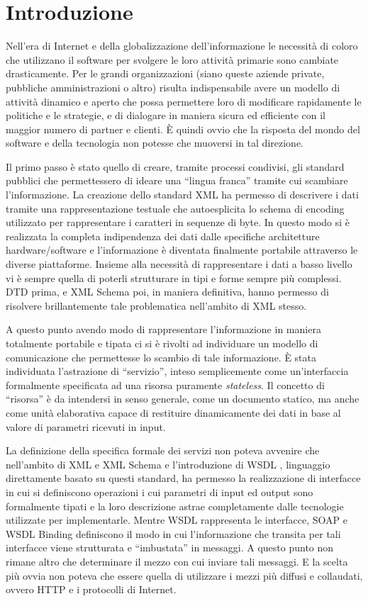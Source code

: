 \chapter{Introduzione}

Nell'era di Internet e della globalizzazione dell'informazione le necessità di
coloro che utilizzano il software per svolgere le loro attività primarie sono
cambiate drasticamente. Per le grandi organizzazioni (siano queste aziende
private, pubbliche amministrazioni o altro) risulta indispensabile avere un
modello di attività dinamico e aperto che possa permettere loro di modificare
rapidamente le politiche e le strategie, e di dialogare in maniera sicura ed
efficiente con il maggior numero di partner e clienti. \`E quindi ovvio che la
risposta del mondo del software e della tecnologia non potesse che muoversi in
tal direzione. 

Il primo passo è stato quello di creare, tramite processi condivisi, gli standard
pubblici che permettessero di ideare una ``lingua franca'' tramite cui scambiare
l'informazione. La creazione dello standard XML \cite{XML} ha permesso di
descrivere i dati tramite una rappresentazione testuale che autoesplicita lo
schema di encoding utilizzato per rappresentare i caratteri in sequenze di byte.
In questo modo si è realizzata la completa indipendenza dei dati dalle specifiche
architetture hardware/software e l'informazione è diventata finalmente portabile
attraverso le diverse piattaforme. Insieme alla necessità di rappresentare i dati
a basso livello vi è sempre quella di poterli strutturare in tipi e forme sempre
più complessi. DTD \cite{XML10} prima, e XML Schema \cite{XMLSchema} poi, in
maniera definitiva, hanno permesso di risolvere brillantemente tale problematica
nell'ambito di XML stesso.

A questo punto avendo modo di rappresentare l'informazione in maniera totalmente
portabile e tipata ci si è rivolti ad individuare un modello di comunicazione che
permettesse lo scambio di tale informazione. \`E stata individuata l'astrazione
di ``servizio'', inteso semplicemente come un'interfaccia formalmente specificata
ad una risorsa puramente \emph{stateless}. Il concetto di ``risorsa'' è da
intendersi in senso generale, come un documento statico, ma anche come unità
elaborativa capace di restituire dinamicamente dei dati in base al valore di
parametri ricevuti in input.

La definizione della specifica formale dei servizi non poteva avvenire che
nell'ambito di XML e XML Schema e l'introduzione di WSDL \cite{WSDL}, linguaggio
direttamente basato su questi standard, ha permesso la realizzazione di
interfacce in cui si definiscono operazioni i cui parametri di input ed output
sono formalmente tipati e la loro descrizione astrae completamente dalle
tecnologie utilizzate per implementarle. Mentre WSDL rappresenta le interfacce,
SOAP \cite{SOAP} e WSDL Binding \cite{WSDL} definiscono il modo in cui l'informazione
che transita per tali interfacce viene strutturata e ``imbustata'' in messaggi. A
questo punto non rimane altro che determinare il mezzo con cui inviare tali
messaggi. E la scelta più ovvia non poteva che essere quella di utilizzare i
mezzi più diffusi e collaudati, ovvero HTTP \cite{HTTP} \cite{HTTP1} e i
protocolli di Internet.

